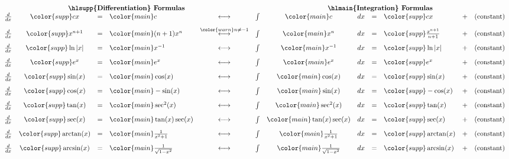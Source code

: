 \documentclass[../main.tex]{subfiles}
\begin{document}
\[
  \begin{array}{rcclcrclllcl} 
    \multicolumn{5}{c}{\text{\textbf{\hlsupp{Differentiation} Formulas}}} & \multicolumn{7}{c}{\text{\textbf{\hlmain{Integration} Formulas}}} \\
    \frac{d}{dx} & {\color{supp} cx} &=& {\color{main} c}
                 & \longleftrightarrow 
                 & \int & {\color{main} c} & dx &=& {\color{supp} cx} 
                 &+& (\text{constant}) \\[2ex]
    \frac{d}{dx} & {\color{supp} x^{n+1}  } &=& {\color{main} (n+1) x^{n}}
                 & \overset{\color{warn} n \ne -1}{\longleftrightarrow}
                 & \int & {\color{main} x^{n}} & dx &=& {\color{supp} \frac{x^{n+1}}{n+1} } 
                 &+& (\text{constant}) \\[2ex]
    \frac{d}{dx} & {\color{supp} \ln|x| } &=& {\color{main} x^{-1}}
                 & \longleftrightarrow 
                 & \int & {\color{main} x^{-1}} & dx &=& {\color{supp} \ln|x|} 
                 &+& (\text{constant}) \\[2ex]
    \frac{d}{dx} & {\color{supp} e^{x}} &=& {\color{main} e^{x}}
                 & \longleftrightarrow
                 & \int & {\color{main} e^{x}      } & dx &=& {\color{supp} e^{x}} 
                 &+& (\text{constant}) \\[2ex]
    \frac{d}{dx} & {\color{supp} \sin(x)} &=& {\color{main} \cos(x)}
                 & \longleftrightarrow 
                 & \int & {\color{main} \cos(x)} & dx &=& {\color{supp} \sin(x)} 
                 &+& (\text{constant}) \\[2ex]
    \frac{d}{dx} & {\color{supp} \cos(x)} &=& {\color{main} -\sin(x)}
                 & \longleftrightarrow 
                 & \int & {\color{main} \sin(x)} & dx &=& {\color{supp} -\cos(x)} 
                 &+& (\text{constant}) \\[2ex]
    \frac{d}{dx} & {\color{supp} \tan(x)} &=& {\color{main} \sec^{2}(x)}
                 & \longleftrightarrow 
                 & \int & {\color{main} \sec^{2}(x)} & dx &=& {\color{supp} \tan(x)} 
                 &+& (\text{constant}) \\[2ex]
    \frac{d}{dx} & {\color{supp} \sec(x)} &=& {\color{main} \tan(x)\sec(x)}
                 & \longleftrightarrow 
                 & \int & {\color{main} \tan(x)\sec(x)} & dx &=& {\color{supp} \sec(x)} 
                 &+& (\text{constant}) \\[2ex]
    \frac{d}{dx} & {\color{supp} \arctan(x)} &=& {\color{main} \frac{1}{x^{2}+1}}
                 & \longleftrightarrow 
                 & \int & {\color{main} \frac{1}{x^{2} + 1}} & dx &=& {\color{supp} \arctan(x)} 
                 &+& (\text{constant}) \\[2ex]
    \frac{d}{dx} & {\color{supp} \arcsin(x)} &=& {\color{main} \frac{1}{\sqrt{1 - x^{2}}}}
                 & \longleftrightarrow 
                 & \int & {\color{main} \frac{1}{\sqrt{1 - x^{2}}}} & dx &=& {\color{supp} \arcsin(x)} 
                 &+& (\text{constant})
  \end{array}
\]
\end{document}

